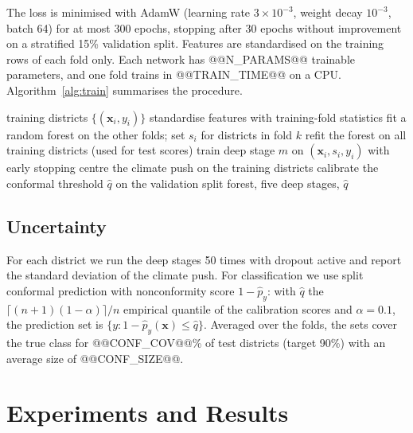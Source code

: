 \documentclass[conference]{IEEEtran}
\begin{document}
The loss is minimised with AdamW (learning rate $3\times10^{-3}$, weight decay $10^{-3}$, batch 64) for at most 300 epochs, stopping after 30 epochs without improvement on a stratified 15\% validation split. Features are standardised on the training rows of each fold only. Each network has @@N_PARAMS@@ trainable parameters, and one fold trains in @@TRAIN_TIME@@ on a CPU. Algorithm~\ref{alg:train} summarises the procedure.

\begin{algorithm}[t]
\caption{Training B-ACPN on one fold}
\label{alg:train}
\begin{algorithmic}[1]
\REQUIRE training districts $\{(\mathbf{x}_i, y_i)\}$
\STATE standardise features with training-fold statistics
  \STATE fit a random forest on the other folds; set $s_i$ for districts in fold $k$
\ENDFOR
\STATE refit the forest on all training districts (used for test scores)
  \STATE train deep stage $m$ on $(\mathbf{x}_i, s_i, y_i)$ with early stopping
\ENDFOR
\STATE centre the climate push on the training districts
\STATE calibrate the conformal threshold $\hat q$ on the validation split
\RETURN forest, five deep stages, $\hat q$
\end{algorithmic}
\end{algorithm}

\subsection{Uncertainty}
For each district we run the deep stages 50 times with dropout active and report the standard deviation of the climate push. For classification we use split conformal prediction with nonconformity score $1-\hat p_{y}$: with $\hat q$ the $\lceil (n+1)(1-\alpha)\rceil/n$ empirical quantile of the calibration scores and $\alpha = 0.1$, the prediction set is $\{y : 1-\hat p_y(\mathbf{x}) \le \hat q\}$. Averaged over the folds, the sets cover the true class for @@CONF_COV@@\% of test districts (target 90\%) with an average size of @@CONF_SIZE@@.

\section{Experiments and Results}
\end{document}
